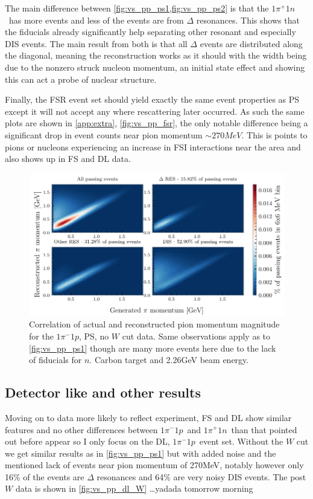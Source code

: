 \documentclass[a4paper,12pt]{article}
\newcommand{\md}{$1\pi^-1p$}
\newcommand{\pd}{$1\pi^+1n$}
\begin{document}
The main difference between \cref{fig:vs_pp_ps1,fig:vs_pp_ps2} is that the \pd\ has more events and less of the events are from $\Delta$ resonances.
This shows that the fiducials already significantly help separating other resonant and especially DIS events.
The main result from both is that all $\Delta$ events are distributed along the diagonal, meaning the reconstruction works as it should with the width being due to the nonzero struck nucleon momentum\footnotemark, an initial state effect and showing this can act a probe of nuclear structure.

Finally, the FSR event set should yield exactly the same event properties as PS except it will not accept any where rescattering later occurred.
As such the same plots are shown in \cref{app:extra}, \cref{fig:vs_pp_fsr}, the only notable difference being a significant drop in event counts near pion momentum $\sim 270\si{MeV}$.
This is points to pions or nucleons experiencing an increase in FSI interactions near the area and also shows up in FS and DL data.

\begin{figure}[H]
    \centering
    \includegraphics{figures/python/vs_pp_C_p_ps.pdf}
    \caption{
        Correlation of actual and reconstructed pion momentum magnitude for the \md, PS, no $W$ cut data.
        Same observations apply as to \cref{fig:vs_pp_ps1} though are many more events here due to the lack of fiducials for $n$.
        Carbon target and 2.26\si{GeV} beam energy.
    }\label{fig:vs_pp_ps2}
\end{figure}

\subsection{Detector like and other results}
Moving on to data more likely to reflect experiment, FS and DL show similar features and no other differences between \md\ and \pd\ than that pointed out before appear so I only focus on the DL, \md\ event set.
Without the $W$ cut we get similar results as in \cref{fig:vs_pp_ps1} but with added noise and the mentioned lack of events near pion momentum of 270\si{MeV}, notably however only 16\% of the events are $\Delta$ resonances and 64\% are very noisy DIS events.
The post $W$ data is shown in \cref{fig:vs_pp_dl_W} \ldots yadada \ldost tomorrow morning
\end{document}
